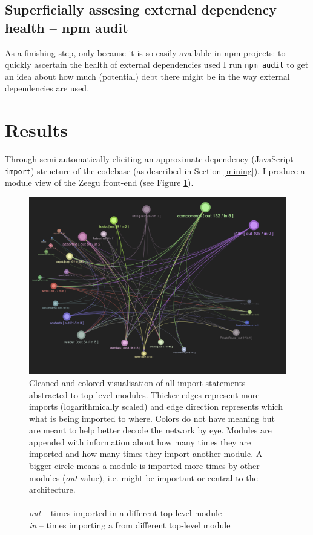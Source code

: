 \documentclass{article}
\begin{document}
\subsection{Superficially assesing external dependency health -- npm audit}

As a finishing step, only because it is so easily available in npm projects:
to quickly ascertain the health of external dependencies used I run \verb|npm audit|
to get an idea about how much (potential) debt there might be in the way external dependencies are used.



\section{Results}



Through semi-automatically eliciting an approximate dependency (JavaScript \verb|import|) structure of the codebase
(as described in Section \ref{mining}),
I produce a module view of the Zeegu front-end (see Figure \ref{fig:3:clean}).

\begin{figure}[h]
  \centering 
  \includegraphics[width=\textwidth]{graphics/module_abstraction_cleaned.png}
  \caption{Cleaned and colored visualisation of all import statements abstracted to top-level modules. 
  Thicker edges represent more imports (logarithmically scaled) and edge 
  direction represents which what is being imported to where.
  Colors do not have meaning but are meant to help better decode the network by eye.
  Modules are appended with information about how many times they are imported and how many times they import another module.
  A bigger circle means a module is imported more times by other modules (\textit{out} value),
  i.e. might be important or central to the architecture. \\ \vspace*{.25em} \\
  \hspace*{2em}\textit{out} -- times imported in a different top-level module \\
  \hspace*{2em}\textit{in} -- times importing a from different top-level module}
  \label{fig:3:clean}
\end{figure}
\end{document}
